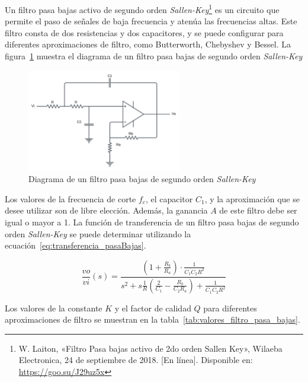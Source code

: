             Un filtro pasa bajas activo de segundo orden \textit{Sallen-Key}\footnote{W. Laiton, «Filtro Pasa bajas activo de 2do orden Sallen Key», Wilaeba Electronica, 24 de septiembre de 2018. [En línea]. Disponible en: \url{https://goo.su/J29uz5x}} es un circuito que permite el paso de señales de baja frecuencia y atenúa las frecuencias altas. Este filtro consta de dos resistencias y dos capacitores, y se puede configurar para diferentes aproximaciones de filtro, como Butterworth, Chebyshev y Bessel. La figura~\ref{fig:Filtro_Pasa_Bajas} muestra el diagrama de un filtro pasa bajas de segundo orden \textit{Sallen-Key}

            \begin{figure}[H]
                \centering
                \includegraphics[width=0.6\textwidth]{img/Desarrollo/Filtro_pasa_bajas.png}
                \caption[Diagrama de un filtro pasa bajas de segundo orden \textit{Sallen-Key}.]{Diagrama de un filtro pasa bajas de segundo orden \textit{Sallen-Key}}
                \label{fig:Filtro_Pasa_Bajas}
            \end{figure}

            Los valores de la frecuencia de corte $f_c$, el capacitor $C_1$, y la aproximación que se desee utilizar son de libre elección. Además, la ganancia $A$ de este filtro debe ser igual o mayor a 1. La función de transferencia de un filtro pasa bajas de segundo orden \textit{Sallen-Key} se puede determinar utilizando la ecuación~\ref{eq:transferencia_pasaBajas}.

            \begin{equation}
                \label{eq:transferencia_pasaBajas}
                \frac{vo}{vi}(s) = \frac{(1+\frac{R_b}{R_a}) \cdot \frac{1}{C_1C_2R^2}}{s^2 + s\frac{1}{R}(\frac{2}{C_1} - \frac{R_b}{C_2R_a}) + \frac{1}{C_1C_2R^2}}
            \end{equation}

            Los valores de la constante $K$ y el factor de calidad $Q$ para diferentes aproximaciones de filtro se muestran en la tabla~\ref{tab:valores_filtro_pasa_bajas}.

